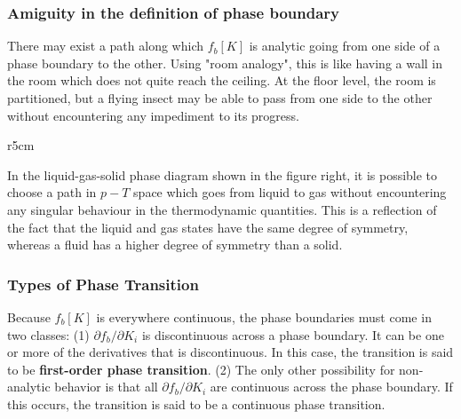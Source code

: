 \documentclass[12pt,titlepage]{article}
\numberwithin{equation}{section}
\begin{document}
\subsubsection{Amiguity in the definition of phase boundary}
There may exist a path along which $f_b[K]$ is analytic going from one side of a phase boundary to the other. Using "room analogy", this is like having a wall in the room which does not quite reach the ceiling. At the floor level, the room is partitioned, but a flying insect may be able to pass from one side to the other without encountering any impediment to its progress.

\begin{wrapfigure}{r}{5cm}
\end{wrapfigure}
In the liquid-gas-solid phase diagram shown in the figure right, it is possible to choose a path in $p-T$ space which goes from liquid to gas without encountering any singular behaviour in the thermodynamic quantities. This is a reflection of the fact that the liquid and gas states have the same degree of symmetry, whereas a fluid has a higher degree of symmetry than a solid.

\subsubsection{Types of Phase Transition}
Because $f_b[K]$ is everywhere continuous, the phase boundaries must come in two classes: (1) $\partial f_b/\partial K_i$ is discontinuous across a phase boundary. It can be one or more of the derivatives that is discontinuous. In this case, the transition is said to be \textbf{first-order phase transition}. (2) The only other possibility for non-analytic behavior is that all $\partial f_b/\partial K_i$ are continuous across the phase boundary. If this occurs, the transition is said to be a continuous phase transition.
\end{document}
